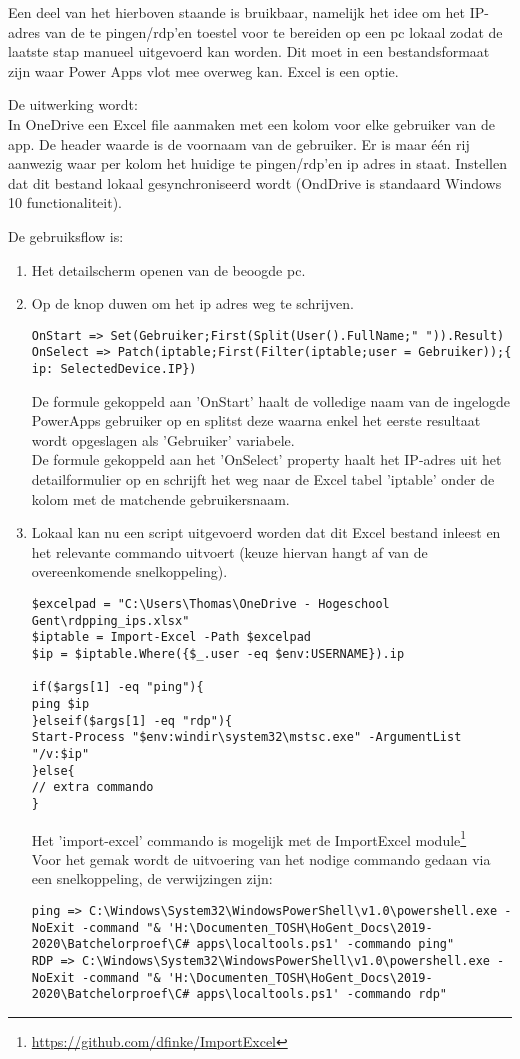 Een deel van het hierboven staande is bruikbaar, namelijk het idee om het IP-adres van de te pingen/rdp'en toestel voor te bereiden op een pc lokaal zodat de laatste stap manueel uitgevoerd kan worden. Dit moet in een bestandsformaat zijn waar Power Apps vlot mee overweg kan. Excel is een optie.

De uitwerking wordt:\\
In OneDrive een Excel file aanmaken met een kolom voor elke gebruiker van de app. De header waarde is  de voornaam van de gebruiker. Er is maar één rij aanwezig waar per kolom het huidige te pingen/rdp'en ip adres in staat. Instellen dat dit bestand lokaal gesynchroniseerd wordt (OndDrive is standaard Windows 10 functionaliteit).

De gebruiksflow is:
\begin{enumerate}
    \item Het detailscherm openen van de beoogde pc.
    \item Op de knop duwen om het ip adres weg te schrijven.
\begin{lstlisting}
OnStart => Set(Gebruiker;First(Split(User().FullName;" ")).Result)
OnSelect => Patch(iptable;First(Filter(iptable;user = Gebruiker));{ ip: SelectedDevice.IP})
\end{lstlisting}
    De formule gekoppeld aan 'OnStart' haalt de volledige naam van de ingelogde PowerApps gebruiker op en splitst deze waarna enkel het eerste resultaat wordt opgeslagen als 'Gebruiker' variabele.\\
    De formule gekoppeld aan het 'OnSelect' property haalt het IP-adres uit het detailformulier op en schrijft het weg naar de Excel tabel 'iptable' onder de kolom met de matchende gebruikersnaam.
    \item Lokaal kan nu een script uitgevoerd worden dat dit Excel bestand inleest en het relevante commando uitvoert (keuze hiervan hangt af van de overeenkomende snelkoppeling).
\begin{lstlisting}[style=powershellStyle]
$excelpad = "C:\Users\Thomas\OneDrive - Hogeschool Gent\rdpping_ips.xlsx"
$iptable = Import-Excel -Path $excelpad
$ip = $iptable.Where({$_.user -eq $env:USERNAME}).ip

if($args[1] -eq "ping"){
ping $ip
}elseif($args[1] -eq "rdp"){
Start-Process "$env:windir\system32\mstsc.exe" -ArgumentList "/v:$ip"
}else{
// extra commando
}
\end{lstlisting}
    Het 'import-excel' commando is mogelijk met de ImportExcel module\footnote{\url{https://github.com/dfinke/ImportExcel}}\\
    Voor het gemak wordt de uitvoering van het nodige commando gedaan via een snelkoppeling, de verwijzingen zijn:
\begin{lstlisting}
ping => C:\Windows\System32\WindowsPowerShell\v1.0\powershell.exe -NoExit -command "& 'H:\Documenten_TOSH\HoGent_Docs\2019-2020\Batchelorproef\C# apps\localtools.ps1' -commando ping"
RDP => C:\Windows\System32\WindowsPowerShell\v1.0\powershell.exe -NoExit -command "& 'H:\Documenten_TOSH\HoGent_Docs\2019-2020\Batchelorproef\C# apps\localtools.ps1' -commando rdp"
\end{lstlisting}
\end{enumerate}

